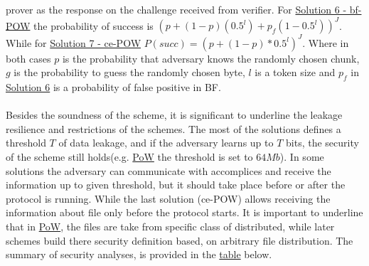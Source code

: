\documentclass[12pt]{article}
\begin{document}
prover as the response on the challenge received from verifier.  For  \hyperref[sub:Soltuion6]{Solution 6 - bf-POW} the probability of success is $(p+(1-p)(0.5^l)+p_f(1-0.5^l))^J$. While for \hyperref[sub:Soltuion7]{Solution 7 - ce-POW} $P(succ) = (p+(1-p)*0.5^l)^J$. Where in both cases $p$ is the probability that adversary knows the randomly chosen chunk, $g$ is the probability to guess the randomly chosen byte, $l$ is a token size and $p_f$ in \hyperref[sub:Soltuion6]{Solution 6} is a probability of false positive in BF.\\\\
Besides the soundness of the scheme, it is significant to underline the leakage resilience  and restrictions of the schemes. The most of the solutions defines a threshold $T$ of data leakage, and if the adversary learns up to $T$ bits, the security of the scheme still holds(e.g.  \hyperref[sub:Soltuion1]{PoW} the threshold is set to $64Mb$). In some solutions the adversary can communicate with accomplices and receive the information up to given threshold, but it should take place before or after the protocol is running. While the last solution (ce-POW)  allows receiving the information about file only before the protocol starts. It is important to underline that in \hyperref[sub:Soltuion1]{PoW}, the files are take from specific class of distributed, while later schemes build there security definition based, on arbitrary file distribution.  The summary of security analyses, is provided in the \hyperref[table:Security]{table} below.
\end{document}
